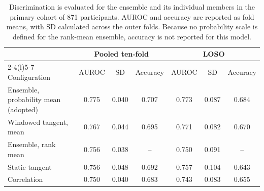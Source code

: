 \begin{table}[pos=htb]
\centering
\caption{Discrimination is evaluated for the ensemble and its individual members in the primary cohort of 871 participants. AUROC and accuracy are reported as fold means, with SD calculated across the outer folds. Because no probability scale is defined for the rank-mean ensemble, accuracy is not reported for this model.}
\label{tab:configurations}
\small
\begin{tabular}{@{}lcccccc@{}}
\toprule
 & \multicolumn{3}{c}{Pooled ten-fold} & \multicolumn{3}{c}{LOSO} \\
\cmidrule(lr){2-4}\cmidrule(l){5-7}
Configuration & AUROC & SD & Accuracy & AUROC & SD & Accuracy \\
\midrule
Ensemble, probability mean (adopted) & 0.775 & 0.040 & 0.707 & 0.773 & 0.087 & 0.684 \\
Windowed tangent, mean & 0.767 & 0.044 & 0.695 & 0.771 & 0.082 & 0.670 \\
Ensemble, rank mean & 0.756 & 0.038 & -- & 0.750 & 0.091 & -- \\
Static tangent & 0.756 & 0.048 & 0.692 & 0.757 & 0.104 & 0.643 \\
Correlation & 0.750 & 0.040 & 0.683 & 0.743 & 0.083 & 0.655 \\
\bottomrule
\end{tabular}
\end{table}

